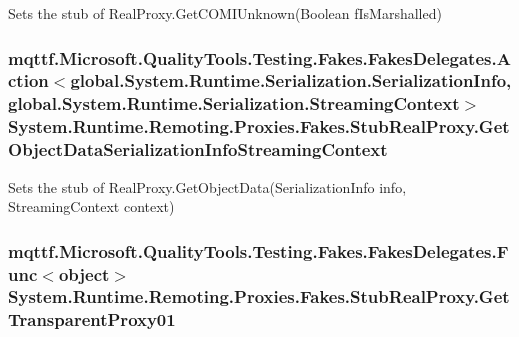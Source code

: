 Sets the stub of Real\-Proxy.\-Get\-C\-O\-M\-I\-Unknown(\-Boolean f\-Is\-Marshalled)

\hypertarget{class_system_1_1_runtime_1_1_remoting_1_1_proxies_1_1_fakes_1_1_stub_real_proxy_a871df9326c85bccecfef66c12e95f439}{
\subsubsection[{Get\-Object\-Data\-Serialization\-Info\-Streaming\-Context}]{\setlength{\rightskip}{0pt plus 5cm}mqttf.\-Microsoft.\-Quality\-Tools.\-Testing.\-Fakes.\-Fakes\-Delegates.\-Action$<$global.\-System.\-Runtime.\-Serialization.\-Serialization\-Info, global.\-System.\-Runtime.\-Serialization.\-Streaming\-Context$>$ System.\-Runtime.\-Remoting.\-Proxies.\-Fakes.\-Stub\-Real\-Proxy.\-Get\-Object\-Data\-Serialization\-Info\-Streaming\-Context}}\label{class_system_1_1_runtime_1_1_remoting_1_1_proxies_1_1_fakes_1_1_stub_real_proxy_a871df9326c85bccecfef66c12e95f439}


Sets the stub of Real\-Proxy.\-Get\-Object\-Data(\-Serialization\-Info info, Streaming\-Context context)

\hypertarget{class_system_1_1_runtime_1_1_remoting_1_1_proxies_1_1_fakes_1_1_stub_real_proxy_a4251c37f3fc64c563a876647edf567e7}{
\subsubsection[{Get\-Transparent\-Proxy01}]{\setlength{\rightskip}{0pt plus 5cm}mqttf.\-Microsoft.\-Quality\-Tools.\-Testing.\-Fakes.\-Fakes\-Delegates.\-Func$<$object$>$ System.\-Runtime.\-Remoting.\-Proxies.\-Fakes.\-Stub\-Real\-Proxy.\-Get\-Transparent\-Proxy01}}\label{class_system_1_1_runtime_1_1_remoting_1_1_proxies_1_1_fakes_1_1_stub_real_proxy_a4251c37f3fc64c563a876647edf567e7}


